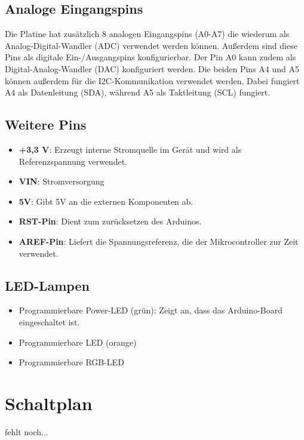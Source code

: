 \subsection{Analoge Eingangspins}
Die Platine hat zusätzlich 8 analogen Eingangspins (A0-A7) die wiederum als Analog-Digital-Wandler (ADC) verwendet werden können. Außerdem sind diese Pins als digitale Ein-/Ausgangspins konfigurierbar. Der Pin A0 kann zudem als Digital-Analog-Wandler (DAC) konfiguriert werden. Die beiden Pins A4 und A5 können außerdem für die I2C-Kommunikation verwendet werden. Dabei fungiert A4 als Datenleitung (SDA), während A5 als Taktleitung (SCL) fungiert.\cite{Ard.2024}

\subsection{Weitere Pins}
\begin{itemize}
	\item \textbf{+3,3 V}: Erzeugt interne Stromquelle im Gerät und wird als Referenzspannung verwendet.
	\item \textbf{VIN}: Stromversorgung
	\item \textbf{5V}: Gibt 5V an die externen Komponenten ab. 
	\item \textbf{RST-Pin}: Dient zum zurücksetzen des Arduinos.
	\item \textbf{AREF-Pin}: Liefert die Spannungsreferenz, die der Mikrocontroller zur Zeit verwendet.
	\\ \cite{Ard.2024}
\end{itemize}

\subsection{LED-Lampen}
\begin{itemize}
Im Arduino selbst sind 3 LED´s verbaut, die auch alle programmiert werden können. Diese sind vor allem für die Überprüfung der Sensorik oder Softwareprogrammen nützlich. Zu den LED-Lampen gehören: 
	\item Programmierbare Power-LED (grün): Zeigt an, dass das Arduino-Board eingeschaltet ist.
	\item Programmierbare LED (orange)
	\item Programmierbare RGB-LED
	\\ \cite{Ard.2024}
\end{itemize}

\section{Schaltplan}
fehlt noch...

